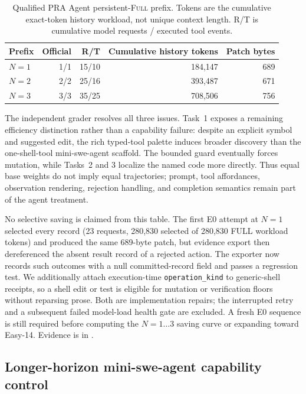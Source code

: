 \documentclass[11pt]{article}
\begin{document}
\begin{table}[H]
\centering
\scriptsize
\caption{Qualified PRA Agent persistent-\textsc{Full} prefix.  Tokens are the
cumulative exact-token history workload, not unique context length.  R/T is
cumulative model requests / executed tool events.}
\label{tab:pra-agent-persistent-full-n3}
\begin{tabular}{lrrrr}
\toprule
Prefix & Official & R/T & Cumulative history tokens & Patch bytes \\
\midrule
$N=1$ & 1/1 & 15/10 & 184,147 & 689 \\
$N=2$ & 2/2 & 25/16 & 393,487 & 671 \\
$N=3$ & 3/3 & 35/25 & 708,506 & 756 \\
\bottomrule
\end{tabular}
\end{table}

The independent grader resolves all three issues.  Task~1 exposes a remaining
efficiency distinction rather than a capability failure: despite an explicit
symbol and suggested edit, the rich typed-tool palette induces broader
discovery than the one-shell-tool mini-swe-agent scaffold.  The bounded guard
eventually forces mutation, while Tasks~2 and 3 localize the named code more
directly.  Thus equal base weights do not imply equal trajectories; prompt,
tool affordances, observation rendering, rejection handling, and completion
semantics remain part of the agent treatment.

No selective saving is claimed from this table.  The first E0 attempt at
$N=1$ selected every record (23 requests, 280,830 selected of 280,830 FULL
workload tokens) and produced the same 689-byte patch, but evidence export
then dereferenced the absent result record of a rejected action.  The exporter
now records such outcomes with a null committed-record field and passes a
regression test.  We additionally attach execution-time
\texttt{operation\_kind} to generic-shell receipts, so a shell edit or test is
eligible for mutation or verification floors without reparsing prose.  Both
are implementation repairs; the interrupted retry and a subsequent failed
model-load health gate are excluded.  A fresh E0 sequence is still required
before computing the $N=1\ldots3$ saving curve or expanding toward Easy-14.
Evidence is in
.

\subsection{Longer-horizon mini-swe-agent capability control}
\end{document}
